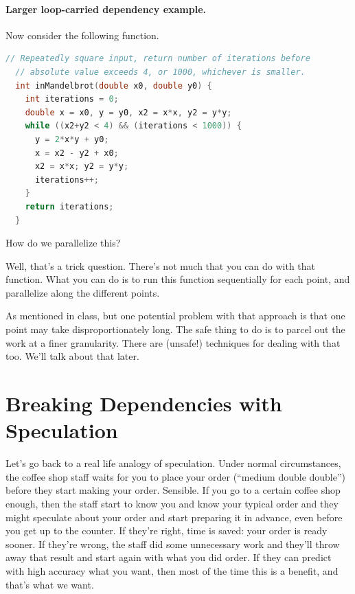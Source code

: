 \documentclass[a4paper]{report}
\begin{document}
\paragraph{Larger loop-carried dependency example.}
Now consider the following function.

\begin{lstlisting}[language=C]
  // Repeatedly square input, return number of iterations before 
  // absolute value exceeds 4, or 1000, whichever is smaller.
  int inMandelbrot(double x0, double y0) {
    int iterations = 0;
    double x = x0, y = y0, x2 = x*x, y2 = y*y;
    while ((x2+y2 < 4) && (iterations < 1000)) {
      y = 2*x*y + y0;
      x = x2 - y2 + x0;
      x2 = x*x; y2 = y*y;
      iterations++;
    }
    return iterations;
  }
\end{lstlisting}

How do we parallelize this?

Well, that's a trick question. There's not much that you can do with that
function. What you can do is to run this function sequentially for each
point, and parallelize along the different points.

As mentioned in class, but one potential problem with that
approach is that one point may take disproportionately long. The safe thing to do is to parcel out the work
at a finer granularity. There are
(unsafe!) techniques for dealing with that too. We'll talk about that
later.



\section*{Breaking Dependencies with Speculation}
Let's go back to a real life analogy of speculation. Under normal circumstances, the coffee shop staff waits for you to place your order (``medium double double'') before they start making your order. Sensible. If you go to a certain coffee shop enough, then the staff start to know you and know your typical order and they might speculate about your order and start preparing it in advance, even before you get up to the counter. If they're right, time is saved: your order is ready sooner. If they're wrong, the staff did some unnecessary work and they'll throw away that result and start again with what you did order. If they can predict with high accuracy what you want, then most of the time this is a benefit, and that's what we want.
\end{document}
